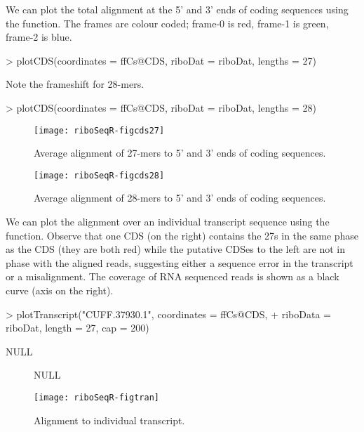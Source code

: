 \documentclass[a4paper]{article}
\begin{document}
We can plot the total alignment at the 5' and 3' ends of coding sequences using the  function. The frames are colour coded; frame-0 is red, frame-1 is green, frame-2 is blue. 
\begin{Schunk}
\begin{Sinput}
> plotCDS(coordinates = ffCs@CDS, riboDat = riboDat, lengths = 27)
\end{Sinput}
\end{Schunk}
Note the frameshift for 28-mers.
\begin{Schunk}
\begin{Sinput}
> plotCDS(coordinates = ffCs@CDS, riboDat = riboDat, lengths = 28)
\end{Sinput}
\end{Schunk}

\begin{figure}[!ht]
\centering
\texttt{[image: riboSeqR-figcds27]}
\label{fig:cds27}
\caption{Average alignment of 27-mers to 5' and 3' ends of coding sequences.}
\end{figure}


\begin{figure}[!ht]
\centering
\texttt{[image: riboSeqR-figcds28]}
\label{fig:cds28}
\caption{Average alignment of 28-mers to 5' and 3' ends of coding sequences.}
\end{figure}



We can plot the alignment over an individual transcript sequence using the  function. Observe that one CDS (on the right) contains the 27s in the same phase as the CDS (they are both red) while the putative CDSes to the left are not in phase with the aligned reads, suggesting either a sequence error in the transcript or a misalignment. The coverage of RNA sequenced reads is shown as a black curve (axis on the right).
\begin{Schunk}
\begin{Sinput}
> plotTranscript("CUFF.37930.1", coordinates = ffCs@CDS, 
+                riboData = riboDat, length = 27, cap = 200)               
\end{Sinput}
\begin{Soutput}
NULL
\end{Soutput}
\end{Schunk}

\begin{figure}[!ht]
\begin{center}
\begin{Schunk}
\begin{Soutput}
NULL
\end{Soutput}
\end{Schunk}
\texttt{[image: riboSeqR-figtran]}
\caption{Alignment to individual transcript.}
\label{fig:trans}
\end{center}
\end{figure}
\end{document}
